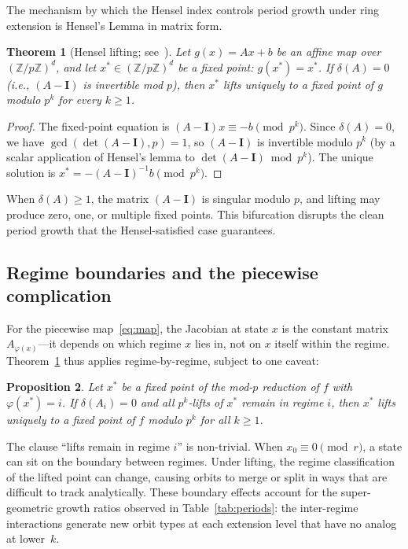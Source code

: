 \documentclass[11pt]{article}
\theoremstyle{plain}
\newtheorem{theorem}{Theorem}[section]
\newtheorem{proposition}[theorem]{Proposition}
\theoremstyle{definition}
\newcommand{\Z}{\mathbb{Z}}
\newcommand{\Id}{\mathbf{I}}
\begin{document}
The mechanism by which the Hensel index controls period growth under ring extension is Hensel's Lemma in matrix form.

\begin{theorem}[Hensel lifting; see~\citealt{Gouvea1997}]
\label{thm:hensel}
Let $g(x) = Ax + b$ be an affine map over $(\Z/p\Z)^d$, and let $x^* \in (\Z/p\Z)^d$ be a fixed point: $g(x^*) = x^*$. If $\delta(A) = 0$ (i.e., $(A-\Id)$ is invertible mod $p$), then $x^*$ lifts uniquely to a fixed point of $g$ modulo $p^k$ for every $k \geq 1$.
\end{theorem}

\begin{proof}[Proof]
The fixed-point equation is $(A-\Id)x \equiv -b \pmod{p^k}$. Since $\delta(A)=0$, we have $\gcd(\det(A-\Id),p)=1$, so $(A-\Id)$ is invertible modulo $p^k$ (by a scalar application of Hensel's lemma to $\det(A-\Id) \bmod p^k$). The unique solution is $x^* = -(A-\Id)^{-1}b \pmod{p^k}$.
\end{proof}

\noindent When $\delta(A) \geq 1$, the matrix $(A-\Id)$ is singular modulo $p$, and lifting may produce zero, one, or multiple fixed points. This bifurcation disrupts the clean period growth that the Hensel-satisfied case guarantees.

\subsection{Regime boundaries and the piecewise complication}

For the piecewise map~\eqref{eq:map}, the Jacobian at state $x$ is the constant matrix $A_{\varphi(x)}$---it depends on which regime $x$ lies in, not on $x$ itself within the regime. Theorem~\ref{thm:hensel} thus applies regime-by-regime, subject to one caveat:

\begin{proposition}
\label{prop:pw-hensel}
Let $x^*$ be a fixed point of the mod-$p$ reduction of $f$ with $\varphi(x^*) = i$. If $\delta(A_i) = 0$ and all $p^k$-lifts of $x^*$ remain in regime $i$, then $x^*$ lifts uniquely to a fixed point of $f$ modulo $p^k$ for all $k \geq 1$.
\end{proposition}

The clause ``lifts remain in regime $i$'' is non-trivial. When $x_0 \equiv 0 \pmod{r}$, a state can sit on the boundary between regimes. Under lifting, the regime classification of the lifted point can change, causing orbits to merge or split in ways that are difficult to track analytically. These boundary effects account for the super-geometric growth ratios observed in Table~\ref{tab:periods}: the inter-regime interactions generate new orbit types at each extension level that have no analog at lower~$k$.
\end{document}
